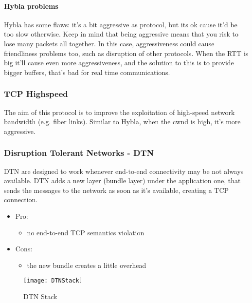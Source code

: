 \paragraph*{Hybla problems} Hybla has some flaws: it's a bit aggressive as
protocol, but its ok cause it'd be too slow otherwise. Keep in mind that being
aggressive means that you risk to lose many packets all together. In this case,
aggressiveness could cause friendliness problems too, such as disruption of
other protocols.
When the RTT is big it'll cause even more aggressiveness, and the solution to
this is to provide bigger buffers, that's bad for real time communications.

\subsubsection{TCP Highspeed}
The aim of this protocol is to improve the exploitation of high-speed network
bandwidth (e.g. fiber links). Similar to Hybla, when the cwnd is high, it's
more aggressive.

\subsubsection{Disruption Tolerant Networks - DTN}
DTN are designed to work whenever end-to-end connectivity may be not always
available. DTN adds a new layer (bundle layer) under the application one, that
sends the messages to the network as soon as it's available, creating a TCP
connection.
\begin{itemize}
\item Pro:
  \begin{itemize}
    \item no end-to-end TCP semantics violation
  \end{itemize}
\item Cons:
  \begin{itemize}
    \item the new bundle creates a little overhead
  \end{itemize}
\end{itemize}

\begin{figure}[H]
  \centering
  \texttt{[image: DTNStack]}
  \caption{DTN Stack}
\end{figure}

